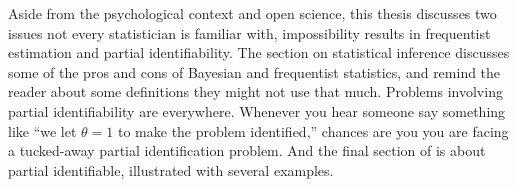 Aside from the psychological context and open science, this thesis discusses two issues not every statistician is familiar with, impossibility results in frequentist estimation and partial identifiability. The section on statistical inference discusses some of the pros and cons of Bayesian and frequentist statistics, and remind the reader about some definitions they might not use that much. Problems involving partial identifiability are everywhere. Whenever you hear someone say something like ``we let $\theta=1$ to make the problem identified,'' chances are you you are facing a tucked-away partial identification problem. And the final section of is about partial identifiable, illustrated with several examples. 